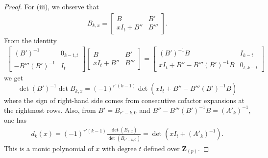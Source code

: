 \documentclass[11pt]{amsart}
\theoremstyle{definition}
\numberwithin{equation}{subsection}
\theoremstyle{plain}
\theoremstyle{plain}
\theoremstyle{plain}
\theoremstyle{plain}
\theoremstyle{plain}
\theoremstyle{plain}
\theoremstyle{plain}
\theoremstyle{plain}
\theoremstyle{plain}
\theoremstyle{plain}
\theoremstyle{plain}
\theoremstyle{plain}
\theoremstyle{definition}
\theoremstyle{definition}
\theoremstyle{definition}
\theoremstyle{remark}
\renewcommand{\(}{\textup{(}}
\renewcommand{\)}{\textup{)}}
\newcommand{\Z}{\mathbf{Z}}
\begin{document}
\begin{proof}
For (iii), we observe that
    \begin{align*}
        B_{k,x}
        =
        \begin{bmatrix}
            B & B' \\
            xI_t+B'' & B'''
        \end{bmatrix}.
    \end{align*}
    From the identity
    \begin{align*}
        \begin{bmatrix}
            (B')^{-1} & 0_{k-t,t} \\
            -B'''(B')^{-1} & I_t
        \end{bmatrix}
        \begin{bmatrix}
            B & B' \\
            xI_t+B'' & B'''
        \end{bmatrix}
        =
        \begin{bmatrix}
            (B')^{-1}B & I_{k-t} \\
            xI_t+B''-B'''(B')^{-1}B & 0_{t,k-t}
        \end{bmatrix}
    \end{align*}
    we get
$$\det (B')^{-1}\det B_{k,x}=(-1)^{r'(k-1)}\det(xI_t+B''-B'''(B')^{-1}B)$$
where the sign of right-hand side comes from consecutive cofactor expansions at the rightmost rows. Also, from $B'=B_{r'-k,0}$ and $B''-B'''(B')^{-1}B=(A'_k)^{-1}$, one has
    \begin{align*}
        d_k(x)=(-1)^{r'(k-1)}\frac{\det(B_{k,x})}{\det(B_{r'-k,0})}=\det(xI_t+(A'_k)^{-1}).
    \end{align*}
This is a monic polynomial of $x$ with degree $t$ defined over $\Z_{(p)}$.
\end{proof}
\end{document}
